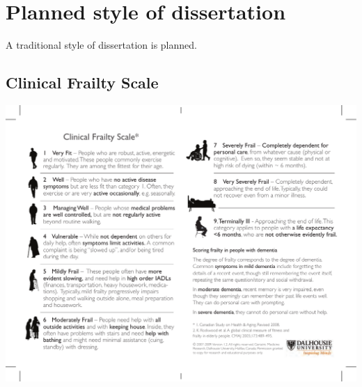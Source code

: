 \documentclass
[
	12pt,
	a4paper,
	oneside,
]{article}
\begin{document}
\section{Planned style of dissertation}
A traditional style of dissertation is planned.

\clearpage
\printbibliography[prenote=needsfixing]

\clearpage
\begin{appendix}

\section{Clinical Frailty Scale}
\label{appendix:CFS}
\includegraphics[width=\textwidth]{CFS}


\end{appendix}
\end{document}

